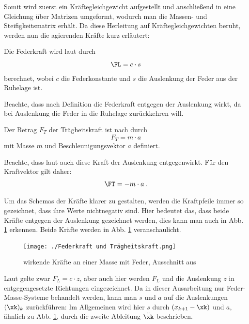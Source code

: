 \documentclass[a4paper,12pt]{report}
\newcommand{\1}{\mathds{1}}
\theoremstyle{plain} %
\theoremstyle{definition} %
\theoremstyle{remark}
\begin{document}
            Somit wird zuerst ein Kräftegleichgewicht aufgestellt und anschließend in eine Gleichung über Matrizen umgeformt,
            wodurch man die Massen- und Steifigkeitsmatrix erhält.
            Da diese Herleitung auf Kräftegleichgewichten beruht, werden nun die agierenden Kräfte kurz erläutert:

            Die Federkraft \FL wird laut \cite{federkraft} durch
            \begin{equation}
                  \label{eqn: Federkraft}
                  \FL = c\cdot s
            \end{equation}
            berechnet, wobei $c$ die Federkonstante und $s$ die Auslenkung der Feder aus der Ruhelage ist.

            Beachte, dass nach Definition die Federkraft entgegen der Auslenkung wirkt, da bei Auslenkung die Feder in die Ruhelage zurückkehren will.
                  
            Der Betrag $F_T$ der Trägheitskraft ist nach \cite{trägheitskraft} durch
            \begin{equation}
                  \label{eqn: Trägheitskraft}
                  F_T = m\cdot a
            \end{equation}
            mit Masse $m$ und Beschleunigungsvektor $a$ definiert.    
            
            Beachte, dass laut \cite{trägheitskraft} auch diese Kraft der Auslenkung entgegenwirkt.
            Für den Kraftvektor \FT gilt daher:
            $$\FT = -m\cdot a\,.$$

            Um das Schemas der Kräfte klarer zu gestalten, werden die Kraftpfeile immer so gezeichnet, dass ihre Werte nichtnegativ sind.
            Hier bedeutet das, dass beide Kräfte entgegen der Auslenkung gezeichnet werden, dies kann man auch in Abb. \ref{fig: KräfteAnFeder} erkennen.
            Beide Kräfte werden in Abb. \ref{fig: KräfteAnFeder} veranschaulicht.

            \begin{figure}[h!t]
                  \centering
                  \texttt{[image: ./Federkraft und Trägheitskraft.png]}
                  \caption{wirkende Kräfte an einer Masse mit Feder, Ausschnitt aus \cite{BildKräfteFeder}}
                  \label{fig: KräfteAnFeder}
            \end{figure}
            Laut \cite{BildKräfteFeder} gelte zwar $F_L = c\cdot z$, aber auch hier werden $F_L$ und die Auslenkung $z$ in entgegengesetzte Richtungen eingezeichnet.
            Da in dieser Ausarbeitung nur Feder-Masse-Systeme behandelt werden, kann man $s$ und $a$ auf die Auslenkungen $(\xk)_k$ zurückführen:
            Im Allgemeinen wird hier $s$ durch $(x_{k+1}-\xk)$ und $a$, ähnlich zu Abb. \ref{fig: KräfteAnFeder}, durch die zweite Ableitung $\ddot \xk$ beschrieben.
\end{document}
